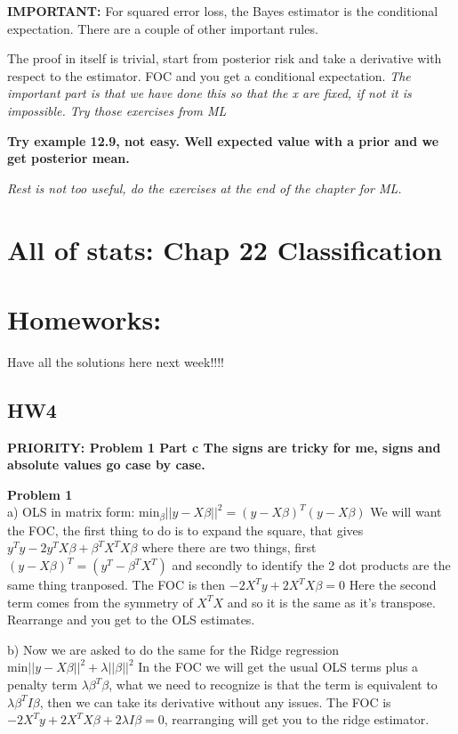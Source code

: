 \documentclass{article}
\begin{document}
\textbf{IMPORTANT:} For squared error loss, the Bayes estimator is the conditional expectation.
There are a couple of other important rules.

The proof in itself is trivial, start from posterior risk and take a derivative with respect to the estimator.
FOC and you get a conditional expectation. \textit{The important part is that we have done this so that the x are fixed, if not it is impossible. Try those exercises from ML}

\textbf{Try example 12.9, not easy. Well expected value with a prior and we get posterior mean.}

\textit{Rest is not too useful, do the exercises at the end of the chapter for ML.}

\section{All of stats: Chap 22 Classification}

\section*{Homeworks:}
Have all the solutions here next week!!!!
\subsection*{HW4}
\textbf{PRIORITY: Problem 1 Part c The signs are tricky for me, signs and absolute values go case by case.}

\noindent\textbf{Problem 1}
\\
a) OLS in matrix form: $\text{min}_\beta ||y-X\beta||^2 = (y-X\beta)^T(y-X\beta)$
We will want the FOC, the first thing to do is to expand the square, that gives
$y^T y - 2y^TX\beta + \beta^TX^TX\beta$ where there are two things, first $(y-X\beta)^T = (y^T -\beta^TX^T)$ and
secondly to identify the 2 dot products are the same thing tranposed. 
The FOC is then $-2X^T y + 2X^TX\beta = 0$ Here the second term comes from the symmetry of $X^TX$ and so it is the same as it's transpose.
Rearrange and you get to the OLS estimates.


b) Now we are asked to do the same for the Ridge regression $\text{min} ||y-X\beta||^2 +\lambda||\beta||^2$
In the FOC we will get the usual OLS terms plus a penalty term $\lambda \beta^T \beta$, what we need to recognize is that the term is equivalent to $\lambda \beta^T I \beta$, 
then we can take its derivative without any issues. 
The FOC is $-2X^Ty +2X^TX\beta + 2\lambda I \beta = 0$, rearranging will get you to 
the ridge estimator. 
\end{document}
